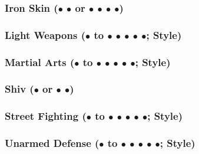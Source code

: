 \documentclass["../Misguided by Starlight.tex"]{subfiles}
\begin{document}
	\subsubsection{Iron Skin ($\bullet$ $\bullet$ or $\bullet$ $\bullet$ $\bullet$ $\bullet$)} %
	
	\subsubsection{Light Weapons ($\bullet$ to $\bullet$ $\bullet$ $\bullet$ $\bullet$ $\bullet$; Style)} %
	
	\subsubsection{Martial Arts ($\bullet$ to $\bullet$ $\bullet$ $\bullet$ $\bullet$ $\bullet$; Style)} %
	
	\subsubsection{Shiv ($\bullet$ or $\bullet$ $\bullet$)} %
	
	\subsubsection{Street Fighting ($\bullet$ to $\bullet$ $\bullet$ $\bullet$ $\bullet$ $\bullet$; Style)} %
	
	\subsubsection{Unarmed Defense ($\bullet$ to $\bullet$ $\bullet$ $\bullet$ $\bullet$ $\bullet$; Style)} %
\end{document}

